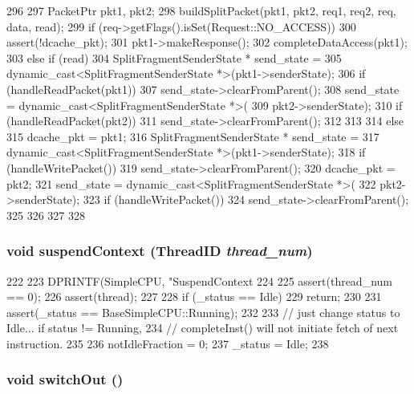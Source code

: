 \begin{DoxyCode}
296 {
297     PacketPtr pkt1, pkt2;
298     buildSplitPacket(pkt1, pkt2, req1, req2, req, data, read);
299     if (req->getFlags().isSet(Request::NO_ACCESS)) {
300         assert(!dcache_pkt);
301         pkt1->makeResponse();
302         completeDataAccess(pkt1);
303     } else if (read) {
304         SplitFragmentSenderState * send_state =
305             dynamic_cast<SplitFragmentSenderState *>(pkt1->senderState);
306         if (handleReadPacket(pkt1)) {
307             send_state->clearFromParent();
308             send_state = dynamic_cast<SplitFragmentSenderState *>(
309                     pkt2->senderState);
310             if (handleReadPacket(pkt2)) {
311                 send_state->clearFromParent();
312             }
313         }
314     } else {
315         dcache_pkt = pkt1;
316         SplitFragmentSenderState * send_state =
317             dynamic_cast<SplitFragmentSenderState *>(pkt1->senderState);
318         if (handleWritePacket()) {
319             send_state->clearFromParent();
320             dcache_pkt = pkt2;
321             send_state = dynamic_cast<SplitFragmentSenderState *>(
322                     pkt2->senderState);
323             if (handleWritePacket()) {
324                 send_state->clearFromParent();
325             }
326         }
327     }
328 }
\end{DoxyCode}
\hypertarget{classTimingSimpleCPU_a1dad4c4d2c3df4ef367e14fcc973ce74}{
\subsubsection[{suspendContext}]{\setlength{\rightskip}{0pt plus 5cm}void suspendContext ({\bf ThreadID} {\em thread\_\-num})}}
\label{classTimingSimpleCPU_a1dad4c4d2c3df4ef367e14fcc973ce74}



\begin{DoxyCode}
222 {
223     DPRINTF(SimpleCPU, "SuspendContext %
224 
225     assert(thread_num == 0);
226     assert(thread);
227 
228     if (_status == Idle)
229         return;
230 
231     assert(_status == BaseSimpleCPU::Running);
232 
233     // just change status to Idle... if status != Running,
234     // completeInst() will not initiate fetch of next instruction.
235 
236     notIdleFraction = 0;
237     _status = Idle;
238 }
\end{DoxyCode}
\hypertarget{classTimingSimpleCPU_a05f299b443f8cc73a93d61572edc0218}{
\subsubsection[{switchOut}]{\setlength{\rightskip}{0pt plus 5cm}void switchOut ()}}
\label{classTimingSimpleCPU_a05f299b443f8cc73a93d61572edc0218}



